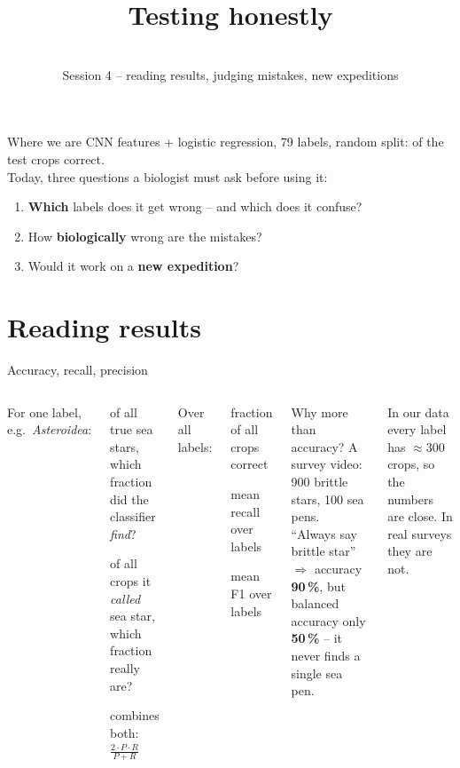 \documentclass[aspectratio=169,11pt]{beamer}
\title{Testing honestly}
\subtitle{\coursetitle\\[2pt]\small Session 4 -- reading results, judging mistakes, new expeditions}
\date{}
\author{}
\begin{document}
\maketitle

\begin{frame}{Where we are}
CNN features + logistic regression, 79 labels, random split: \hl{\RefRandomAcc} of the test crops correct.\\[8pt]
Today, three questions a biologist must ask before using it:
\begin{enumerate}
  \item \textbf{Which} labels does it get wrong -- and which does it confuse?
  \item How \textbf{biologically} wrong are the mistakes?
  \item Would it work on a \textbf{new expedition}?
\end{enumerate}
\end{frame}

\section{Reading results}

\begin{frame}{Accuracy, recall, precision}
\begin{columns}[T]
\small
For one label, e.g.\ \emph{Asteroidea}:
\begin{description}[Precision]
\item[Recall] of all true sea stars, which fraction did the classifier \emph{find}?
\item[Precision] of all crops it \emph{called} sea star, which fraction really are?
\item[F1] combines both: $\frac{2\cdot P\cdot R}{P+R}$
\end{description}
Over all labels:
\begin{description}
\item[Accuracy] fraction of all crops correct
\item[Balanced acc.] mean recall over labels
\item[Macro-F1] mean F1 over labels
\end{description}
\begin{alertblock}{Why more than accuracy?}
A survey video: 900 brittle stars, 100 sea pens.\\
``Always say brittle star'' $\Rightarrow$ accuracy \textbf{90\,\%}, but balanced accuracy only \textbf{50\,\%} -- it never finds a single sea pen.
\end{alertblock}
\small In our data every label has $\approx$300 crops, so the numbers are close. In real surveys they are not.
\end{columns}
\end{frame}
\end{document}
